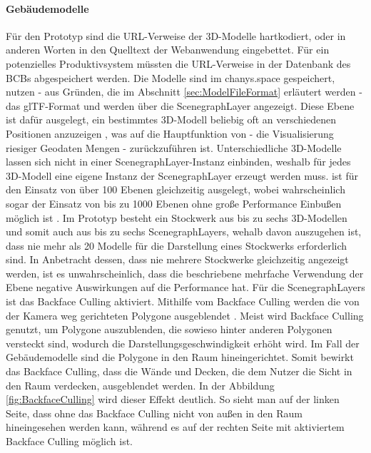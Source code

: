 \paragraph{Gebäudemodelle}
Für den Prototyp sind die \ac{URL}-Verweise der 3D-Modelle hartkodiert, oder in anderen Worten in den Quelltext der Webanwendung eingebettet. Für ein potenzielles Produktivsystem müssten die \ac{URL}-Verweise in der Datenbank des \ac{BCB}s abgespeichert werden. Die Modelle sind im chanys.space gespeichert, nutzen - aus Gründen, die im Abschnitt \ref{sec:ModelFileFormat} erläutert werden - das \ac{glTF}-Format und werden über die ScenegraphLayer angezeigt. Diese Ebene ist dafür ausgelegt, ein bestimmtes 3D-Modell beliebig oft an verschiedenen Positionen anzuzeigen \cite{DeckglScenegraphLayer}, was auf die Hauptfunktion von \deckgl{} - die Visualisierung riesiger Geodaten Mengen \cite[S.~3]{YangWang2019} - zurückzuführen ist. Unterschiedliche 3D-Modelle lassen sich nicht in einer ScenegraphLayer-Instanz einbinden, weshalb für jedes 3D-Modell eine eigene Instanz der ScenegraphLayer erzeugt werden muss. \deckgl{} ist für den Einsatz von über 100 Ebenen gleichzeitig ausgelegt, wobei wahrscheinlich sogar der Einsatz von bis zu 1000 Ebenen ohne große Performance Einbußen möglich ist \cite{DeckglPerformance}. Im Prototyp besteht ein Stockwerk aus bis zu sechs 3D-Modellen und somit auch aus bis zu sechs ScenegraphLayers, wehalb davon auszugehen ist, dass nie mehr als 20 Modelle für die Darstellung eines Stockwerks erforderlich sind. In Anbetracht dessen, dass nie mehrere Stockwerke gleichzeitig angezeigt werden, ist es unwahrscheinlich, dass die beschriebene mehrfache Verwendung der Ebene negative Auswirkungen auf die Performance hat. Für die ScenegraphLayers ist das Backface Culling aktiviert. Mithilfe vom Backface Culling werden die von der Kamera weg gerichteten Polygone ausgeblendet \cite{BackfaceCulling}. Meist wird Backface Culling genutzt, um Polygone auszublenden, die sowieso hinter anderen Polygonen versteckt sind, wodurch die Darstellungsgeschwindigkeit erhöht wird. Im Fall der Gebäudemodelle sind die Polygone in den Raum hineingerichtet. Somit bewirkt das Backface Culling, dass die Wände und Decken, die dem Nutzer die Sicht in den Raum verdecken, ausgeblendet werden. In der Abbildung \ref{fig:BackfaceCulling} wird dieser Effekt deutlich. So sieht man auf der linken Seite, dass ohne das Backface Culling nicht von außen in den Raum hineingesehen werden kann, während es auf der rechten Seite mit aktiviertem Backface Culling möglich ist.

